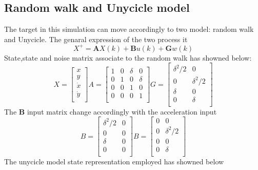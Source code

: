 \documentclass{article}
\begin{document}
\begin{multicols}{2}
    \subsection*{Random walk and Unycicle model}
    The target in this simulation can move accordingly to two model: random walk and Unycicle. The genaral expression of the two process it
    \begin{equation}
    X^{+}= \textbf{A}X(k) + \textbf{B}u(k) + \textbf{G}w(k)
    \end{equation}
    State,state and noise matrix associate to the random walk has showned below:
    \[ X=\begin{bmatrix} x \\ y \\ \dot{x} \\ \dot{y} \\ \end{bmatrix}  A=\begin{bmatrix}
        1&0&\delta&0\\
        0&1&0&\delta\\
        0&0&1&0\\
        0&0&0&1\\
        \end{bmatrix}
        G=\begin{bmatrix}
            \delta^2/2&0\\
            0&\delta^2/2\\
            \delta&0\\
            0&\delta\\
            \end{bmatrix}
        \]
        The \textbf{B} input matrix change accordingly with the acceleration input
    \[
        B=\begin{bmatrix}
            \delta^2/2 & 0\\
            0 & 0  \\
            \delta & 0 \\
            0 & 0 \\
            \end{bmatrix}
            B=\begin{bmatrix}
                0 & 0 \\
             0 & \delta^2/2 \\
            0 & 0 \\
            0 & \delta \\
            \end{bmatrix}
  \]
   The unycicle model state representation employed has showned below


\end{multicols}
\end{document}
